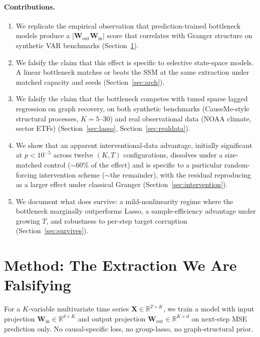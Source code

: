 \documentclass{article}
\begin{document}
\paragraph{Contributions.}
\begin{enumerate}
  \item We replicate the empirical observation that prediction-trained
  bottleneck models produce a $|\mathbf{W}_{\text{out}}
  \mathbf{W}_{\text{in}}|$ score that correlates with Granger structure
  on synthetic VAR benchmarks (Section~\ref{sec:observation}).
  \item We falsify the claim that this effect is specific to
  selective state-space models. A linear bottleneck matches or beats
  the SSM at the same extraction under matched capacity and seeds
  (Section~\ref{sec:arch}).
  \item We falsify the claim that the bottleneck competes with tuned
  sparse lagged regression on graph recovery, on both synthetic
  benchmarks (CauseMe-style structural processes, $K=5$–$30$) and
  real observational data (NOAA climate, sector ETFs)
  (Section~\ref{sec:lasso}, Section~\ref{sec:realdata}).
  \item We show that an apparent interventional-data advantage,
  initially significant at $p < 10^{-5}$ across twelve
  $(K, T)$ configurations, dissolves under a size-matched control
  ($\sim$60\% of the effect) and is specific to a particular
  random-forcing intervention scheme ($\sim$the remainder), with the
  residual reproducing as a larger effect under classical Granger
  (Section~\ref{sec:intervention}).
  \item We document what does survive: a mild-nonlinearity regime
  where the bottleneck marginally outperforms Lasso, a
  sample-efficiency advantage under growing $T$, and robustness to
  per-step target corruption (Section~\ref{sec:survives}).
\end{enumerate}

\section{Method: The Extraction We Are Falsifying}
\label{sec:observation}

For a $K$-variable multivariate time series $\mathbf{X} \in
\mathbb{R}^{T \times K}$, we train a model with input projection
$\mathbf{W}_{\text{in}} \in \mathbb{R}^{d \times K}$ and output
projection $\mathbf{W}_{\text{out}} \in \mathbb{R}^{K \times d}$ on
next-step MSE prediction only. No causal-specific loss, no
group-lasso, no graph-structural prior.
\end{document}
